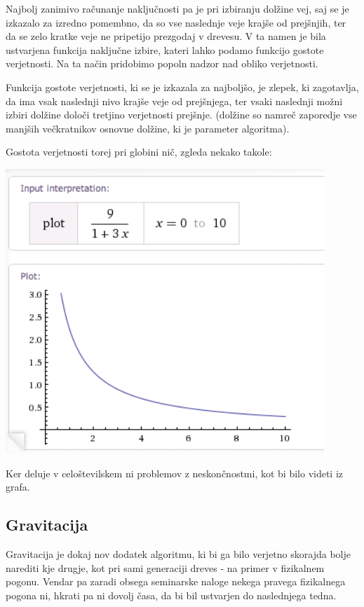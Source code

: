 \documentclass[10pt,a4paper,oneside]{book}
\begin{document}
Najbolj zanimivo računanje naključnosti pa je pri izbiranju dolžine
vej, saj se je izkazalo za izredno pomembno, da so vse naslednje veje
krajše od prejšnjih, ter da se zelo kratke veje ne pripetijo prezgodaj
v drevesu. V ta namen je bila ustvarjena funkcija naključne izbire,
kateri lahko podamo funkcijo gostote verjetnosti. Na ta način
pridobimo popoln nadzor nad obliko verjetnosti.

Funkcija gostote verjetnosti, ki se je izkazala za najboljšo, je
zlepek, ki zagotavlja, da ima vsak naslednji nivo krajše veje od
prejšnjega, ter vsaki naslednji možni izbiri dolžine določi tretjino
verjetnosti prejšnje. (dolžine so namreč zaporedje vse manjših
večkratnikov osnovne dolžine, ki je parameter algoritma).

Gostota verjetnosti torej pri globini nič, zgleda nekako takole:

\includegraphics[width=12cm]{probabilityplot.png}

Ker deluje v celoštevilskem ni problemov z neskončnostmi, kot bi bilo
videti iz grafa.

\subsection{Gravitacija}
Gravitacija je dokaj nov dodatek algoritmu, ki bi ga bilo verjetno
skorajda bolje narediti kje drugje, kot pri sami generaciji dreves -
na primer v fizikalnem pogonu. Vendar pa zaradi obsega seminarske
naloge nekega pravega fizikalnega pogona ni, hkrati pa ni dovolj časa,
da bi bil ustvarjen do naslednjega tedna.
\end{document}
